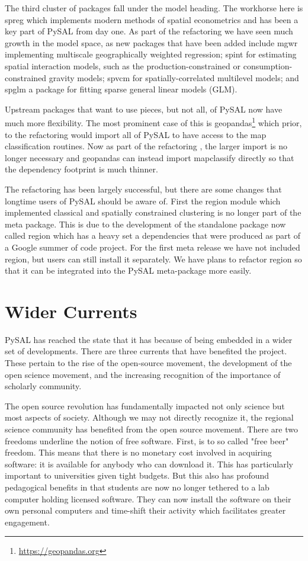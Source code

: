 \documentclass[11pt]{article}
\begin{document}
The third cluster of packages fall under the model heading. The workhorse here
is spreg which implements modern methods of spatial econometrics and has been a
key part of PySAL from day one. As part of the refactoring we have seen much
growth in the model space, as new packages that have been added include mgwr
implementing multiscale geographically weighted regression; spint for
estimating spatial interaction models, such as the production-constrained or
consumption-constrained gravity models;  spvcm for spatially-correlated
multilevel models; and spglm a package for fitting sparse general linear models
(GLM).


Upstream packages that want to use pieces, but not all, of PySAL now have much
more flexibility. The most prominent case of this is geopandas\footnote{\url{https://geopandas.org}}
which prior, to the refactoring would import all of PySAL to have access to
the map classification routines. Now as part of the refactoring , the larger
import is no longer necessary and geopandas can instead import mapclassify
directly so that the dependency footprint is much thinner.


The refactoring has been largely successful, but there are some changes that
longtime users of PySAL should be aware of. First the region module which
implemented classical and spatially constrained clustering is no longer part of
the meta package. This is due to the development of the standalone package now
called region which has a heavy set a dependencies that were produced as part
of a Google summer of code project. For the first meta release we have not
included region, but users can still install it separately. We have plans to
refactor region so that it can be integrated into the PySAL meta-package more
easily.

\section*{Wider Currents}
\label{sec:org701c4d3}
PySAL has reached the state that it has because of being embedded in a wider set
of developments. There are three currents that have benefited the project. These
pertain to the rise of the open-source movement, the development of the open
science movement, and the increasing recognition of the importance of scholarly
community.

The open source revolution has fundamentally impacted not only science but most
aspects of society. Although we may not directly recognize it, the regional
science community has benefited from the open source movement. There are two
freedoms underline the notion of free software. First, is to so called "free
beer" freedom. This means that there is no monetary cost involved in acquiring
software: it is available for anybody who can download it. This has
particularly important to universities given tight budgets. But this also has
profound pedagogical benefits in that students are now no longer tethered to a
lab computer holding licensed software. They can now install the software on
their own personal computers and time-shift their activity which facilitates
greater engagement.
\end{document}
